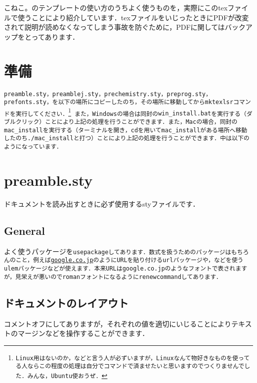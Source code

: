 \documentclass[a4paper, 9pt]{jsarticle}
\title{\sf{こねこ。のテンプレートver2.3使用方法}}
\author{\sf{こねこ。}}
\date{\sf{\today}}
\begin{document}
\maketitle
こねこ。のテンプレートの使い方のうちよく使うものを，実際にこのtexファイルで使うことにより紹介しています．texファイルをいじったときにPDFが改変されて説明が読めなくなってしまう事故を防ぐために，PDFに関してはバックアップをとってあります．\par 
\section{準備}
\tt{preamble.sty}，\tt{preamblej.sty}，\tt{prechemistry.sty}，\tt{preprog.sty}，\tt{prefonts.sty}，を以下の場所にコピーしたのち，その場所に移動してから\tt{mktexlsr}コマンドを実行してください．\footnote{Linux用はないのか，などと言う人が必ずいますが，Linuxなんて物好きなものを使ってる人ならこの程度の処理は自分でコマンドで済ませたいと思いますのでつくりませんでした．みんな，Ubuntu使おうぜ．}
また，Windowsの場合は同封の\tt{win\_install.bat}を実行する（ダブルクリック）ことにより上記の処理を行うことができます．また，Macの場合，同封の\tt{mac\_install}を実行する（ターミナルを開き，\tt{cd}を用いて\tt{mac\_install}がある場所へ移動したのち\tt{./mac\_install}と打つ）ことにより上記の処理を行うことができます．中は以下のようになっています．



\section{preamble.sty}
ドキュメントを読み出すときに必ず使用するstyファイルです．
\subsection{General}
よく使うパッケージを\tt{usepackage}してあります．数式を扱うためのパッケージはもちろんのこと，例えば\url{google.co.jp}のようにURLを貼り付ける\tt{url}パッケージや，などを使う\tt{ulem}パッケージなどが使えます．本来URLは\tt{google.co.jp}のようなフォントで表されますが，見栄えが悪いのでromanフォントになるように\tt{renewcommand}してあります．
\subsection{ドキュメントのレイアウト}
コメントオフにしてありますが，それぞれの値を適切にいじることによりテキストのマージンなどを操作することができます．
\end{document}
